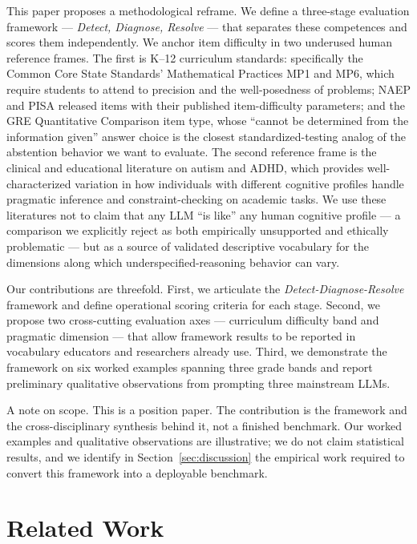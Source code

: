 \documentclass[11pt,letterpaper]{article}
\begin{document}
This paper proposes a methodological reframe. We define a three-stage evaluation framework --- \emph{Detect, Diagnose, Resolve} --- that separates these competences and scores them independently. We anchor item difficulty in two underused human reference frames. The first is K--12 curriculum standards: specifically the Common Core State Standards' Mathematical Practices MP1 and MP6, which require students to attend to precision and the well-posedness of problems; NAEP and PISA released items with their published item-difficulty parameters; and the GRE Quantitative Comparison item type, whose ``cannot be determined from the information given'' answer choice is the closest standardized-testing analog of the abstention behavior we want to evaluate. The second reference frame is the clinical and educational literature on autism and ADHD, which provides well-characterized variation in how individuals with different cognitive profiles handle pragmatic inference and constraint-checking on academic tasks. We use these literatures not to claim that any LLM ``is like'' any human cognitive profile --- a comparison we explicitly reject as both empirically unsupported and ethically problematic --- but as a source of validated descriptive vocabulary for the dimensions along which underspecified-reasoning behavior can vary.

Our contributions are threefold. First, we articulate the \emph{Detect-Diagnose-Resolve} framework and define operational scoring criteria for each stage. Second, we propose two cross-cutting evaluation axes --- curriculum difficulty band and pragmatic dimension --- that allow framework results to be reported in vocabulary educators and researchers already use. Third, we demonstrate the framework on six worked examples spanning three grade bands and report preliminary qualitative observations from prompting three mainstream LLMs.

A note on scope. This is a position paper. The contribution is the framework and the cross-disciplinary synthesis behind it, not a finished benchmark. Our worked examples and qualitative observations are illustrative; we do not claim statistical results, and we identify in Section~\ref{sec:discussion} the empirical work required to convert this framework into a deployable benchmark.

\section{Related Work}
\end{document}
